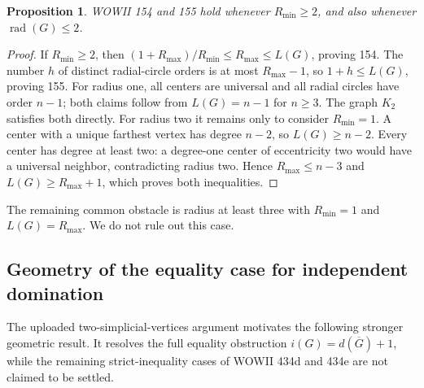 \documentclass[11pt,a4paper]{article}
\newtheorem{proposition}[theorem]{Proposition}
\theoremstyle{remark}
\begin{document}
\begin{proposition}
WOWII 154 and 155 hold whenever $R_{\min}\ge2$, and also whenever
$\operatorname{rad}(G)\le2$.
\end{proposition}
\begin{proof}
If $R_{\min}\ge2$, then
$(1+R_{\max})/R_{\min}\le R_{\max}\le L(G)$, proving 154.
The number $h$ of distinct radial-circle orders is at most
$R_{\max}-1$, so $1+h\le L(G)$, proving 155.
For radius one, all centers are universal and all radial circles
have order $n-1$; both claims follow from $L(G)=n-1$ for $n\ge3$.
The graph $K_2$ satisfies both directly.
For radius two it remains only to consider $R_{\min}=1$.
A center with a unique farthest vertex has degree $n-2$, so
$L(G)\ge n-2$. Every center has degree at least two: a degree-one
center of eccentricity two would have a universal neighbor, contradicting
radius two. Hence $R_{\max}\le n-3$ and
$L(G)\ge R_{\max}+1$, which proves both inequalities.
\end{proof}
The remaining common obstacle is radius at least three with
$R_{\min}=1$ and $L(G)=R_{\max}$. We do not rule out this case.

\subsection{Geometry of the equality case for independent domination}
\label{r9:eqgeometry}
The uploaded two-simplicial-vertices argument motivates the following
stronger geometric result. It resolves the full equality obstruction
$i(G)=d(\overline G)+1$, while the remaining strict-inequality cases
of WOWII 434d and 434e are not claimed to be settled.
\end{document}
